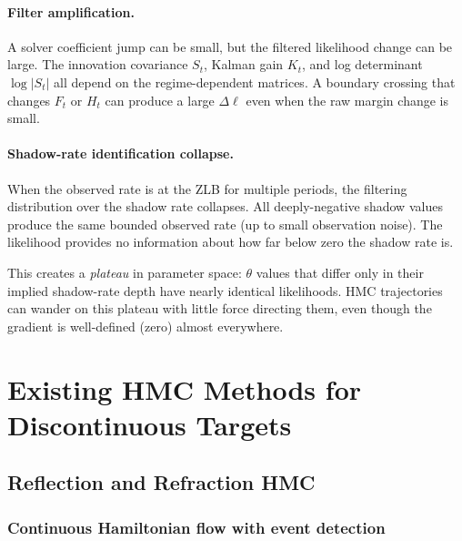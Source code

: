 \paragraph{Filter amplification.}
A solver coefficient jump can be small, but the filtered likelihood change can
be large. The innovation covariance $S_t$, Kalman gain $K_t$, and log
determinant $\log |S_t|$ all depend on the regime-dependent matrices. A
boundary crossing that changes $F_t$ or $H_t$ can produce a large
$\Delta \ell$ even when the raw margin change is small.

\paragraph{Shadow-rate identification collapse.}
When the observed rate is at the ZLB for multiple periods, the filtering
distribution over the shadow rate collapses. All deeply-negative shadow values
produce the same bounded observed rate (up to small observation noise). The
likelihood provides no information about how far below zero the shadow rate is.

This creates a \emph{plateau} in parameter space: $\theta$ values that differ
only in their implied shadow-rate depth have nearly identical likelihoods. HMC
trajectories can wander on this plateau with little force directing them, even
though the gradient is well-defined (zero) almost everywhere.

\section{Existing HMC Methods for Discontinuous Targets}

\subsection{Reflection and Refraction HMC}

\subsubsection{Continuous Hamiltonian flow with event detection}

